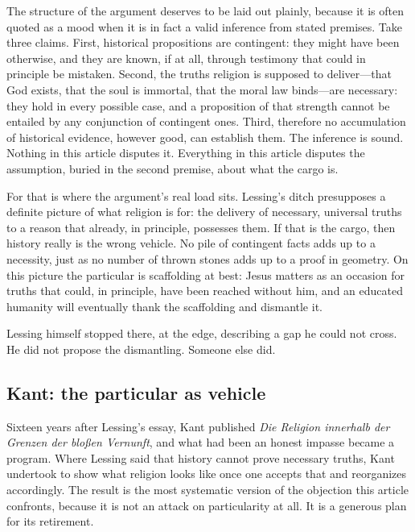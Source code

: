 The structure of the argument deserves to be laid out plainly, because it is often quoted as a mood when it is in fact a valid inference from stated premises. Take three claims. First, historical propositions are contingent: they might have been otherwise, and they are known, if at all, through testimony that could in principle be mistaken. Second, the truths religion is supposed to deliver---that God exists, that the soul is immortal, that the moral law binds---are necessary: they hold in every possible case, and a proposition of that strength cannot be entailed by any conjunction of contingent ones. Third, therefore no accumulation of historical evidence, however good, can establish them. The inference is sound. Nothing in this article disputes it. Everything in this article disputes the assumption, buried in the second premise, about what the cargo is.

For that is where the argument's real load sits. Lessing's ditch presupposes a definite picture of what religion is for: the delivery of necessary, universal truths to a reason that already, in principle, possesses them. If that is the cargo, then history really is the wrong vehicle. No pile of contingent facts adds up to a necessity, just as no number of thrown stones adds up to a proof in geometry. On this picture the particular is scaffolding at best: Jesus matters as an occasion for truths that could, in principle, have been reached without him, and an educated humanity will eventually thank the scaffolding and dismantle it.

Lessing himself stopped there, at the edge, describing a gap he could not cross. He did not propose the dismantling. Someone else did.

\subsection{Kant: the particular as vehicle}

Sixteen years after Lessing's essay, Kant published \emph{Die Religion innerhalb der Grenzen der blo\ss{}en Vernunft}, and what had been an honest impasse became a program. Where Lessing said that history cannot prove necessary truths, Kant undertook to show what religion looks like once one accepts that and reorganizes accordingly. The result is the most systematic version of the objection this article confronts, because it is not an attack on particularity at all. It is a generous plan for its retirement.

